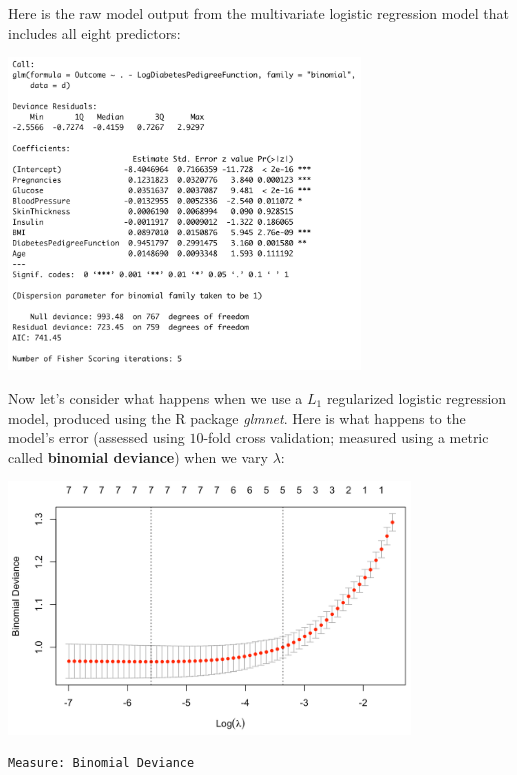 \begin{question}{}
Here is the raw model output from the multivariate logistic regression model that includes all eight predictors:
\begin{center}
\includegraphics[width=0.7\textwidth]{img/cor-example-multivar.png}
\end{center}
Now let's consider what happens when we use a $L_1$ regularized logistic regression model, produced using the R package \emph{glmnet}. Here is what happens to the model's error (assessed using $10$-fold cross validation; measured using a metric called \textbf{binomial deviance}) when we vary $\lambda$:
\begin{center}
\includegraphics[width=0.8\textwidth]{img/pima-glmnet-plot.png}
{\small
\begin{verbatim}
Measure: Binomial Deviance 


\end{verbatim}}
\end{center}
\end{question}
